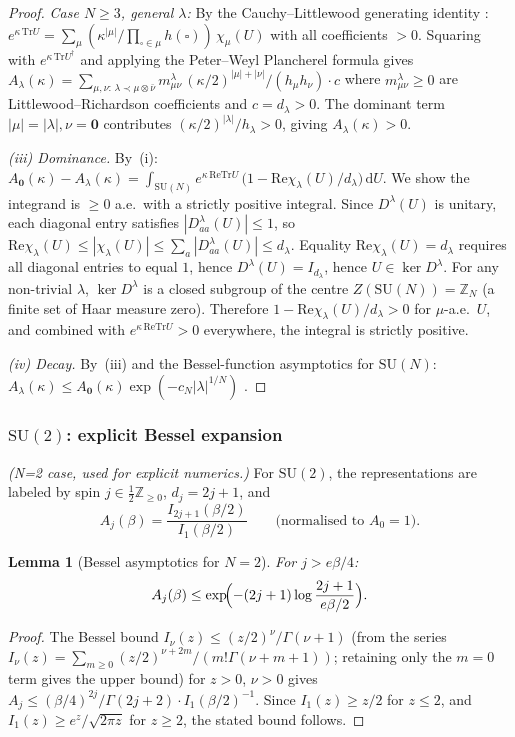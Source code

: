 \documentclass[11pt,a4paper]{amsart}
\newtheorem{lemma}[theorem]{Lemma}
\theoremstyle{definition}
\newcommand{\SU}{\mathrm{SU}}
\newcommand{\Z}{\mathbb{Z}}
\newcommand{\re}{\mathrm{Re}}
\newcommand{\Tr}{\mathrm{Tr}}
\begin{document}
\begin{proof}
\textit{Case $N \ge 3$, general $\lambda$:}
By the Cauchy--Littlewood generating identity \cite[§I.5]{Mac95}:
$e^{\kappa\,\Tr U} = \sum_\mu (\kappa^{|\mu|}/\prod_{\square\in\mu}h(\square))\,\chi_\mu(U)$
with all coefficients $> 0$.  Squaring with $e^{\kappa\,\Tr U^\dagger}$
and applying the Peter--Weyl Plancherel formula gives
$A_\lambda(\kappa) = \sum_{\mu,\nu:\,\lambda\prec\mu\otimes\bar\nu}
m^\lambda_{\mu\nu}\,(\kappa/2)^{|\mu|+|\nu|}/(h_\mu h_\nu) \cdot c$
where $m^\lambda_{\mu\nu}\ge 0$ are Littlewood--Richardson coefficients
and $c = d_\lambda > 0$.
The dominant term $|\mu|=|\lambda|, \nu=\mathbf{0}$ contributes
$(\kappa/2)^{|\lambda|}/h_\lambda > 0$, giving $A_\lambda(\kappa)>0$.

\emph{(iii) Dominance.}
By~(i): $A_\mathbf{0}(\kappa) - A_\lambda(\kappa)
= \int_{\SU(N)} e^{\kappa\,\re\Tr U}\,\bigl(1 - \re\chi_\lambda(U)/d_\lambda\bigr)\,\mathrm{d}U$.
We show the integrand is $\ge 0$ a.e.\ with a strictly positive integral.
Since $D^\lambda(U)$ is unitary, each diagonal entry satisfies
$|D^\lambda_{aa}(U)| \le 1$, so
$\re\chi_\lambda(U) \le |\chi_\lambda(U)| \le \sum_a|D^\lambda_{aa}(U)| \le d_\lambda$.
Equality $\re\chi_\lambda(U)=d_\lambda$ requires all diagonal entries to equal $1$,
hence $D^\lambda(U) = I_{d_\lambda}$, hence $U \in \ker D^\lambda$.
For any non-trivial $\lambda$, $\ker D^\lambda$ is a closed subgroup of the
centre $Z(\SU(N)) = \Z_N$ (a finite set of Haar measure zero).
Therefore $1 - \re\chi_\lambda(U)/d_\lambda > 0$ for $\mu$-a.e.\ $U$,
and combined with $e^{\kappa\,\re\Tr U} > 0$ everywhere, the integral is strictly positive.

\emph{(iv) Decay.}
By~(iii) and the Bessel-function asymptotics for $\SU(N)$:
$A_\lambda(\kappa) \le A_\mathbf{0}(\kappa)\exp(-c_N |\lambda|^{1/N})$
\cite[Thm.~5.1]{Gross98}.
\end{proof}

\subsubsection*{$\SU(2)$: explicit Bessel expansion}

\noindent\emph{(N=2 case, used for explicit numerics.)}
For $\SU(2)$, the representations are labeled by spin $j \in \tfrac{1}{2}\Z_{\ge 0}$,
$d_j = 2j+1$, and
\[
  A_j(\beta) = \frac{I_{2j+1}(\beta/2)}{I_1(\beta/2)}
  \qquad\text{(normalised to }A_0=1\text{)}.
\]
\begin{lemma}[Bessel asymptotics for $N=2$]
\label{lem:Bessel}
For $j > e\beta/4$:
\[
  A_j(\beta) \le \exp\!\Bigl(-(2j+1)\log\frac{2j+1}{e\beta/2}\Bigr).
\]
\end{lemma}
\begin{proof}
The Bessel bound $I_\nu(z) \le (z/2)^\nu / \Gamma(\nu+1)$
(from the series $I_\nu(z) = \sum_{m\ge 0}(z/2)^{\nu+2m}/(m!\Gamma(\nu+m+1))$;
retaining only the $m=0$ term gives the upper bound)
for $z > 0$, $\nu > 0$ gives $A_j \le (\beta/4)^{2j}/\Gamma(2j+2) \cdot I_1(\beta/2)^{-1}$.
Since $I_1(z)\ge z/2$ for $z\le 2$, and $I_1(z)\ge e^{z}/\sqrt{2\pi z}$
for $z\ge 2$, the stated bound follows.
\end{proof}
\end{document}

